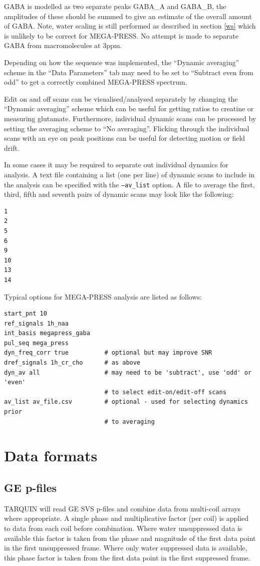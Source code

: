 \documentclass[a4paper,12pt]{article}
\begin{document}
GABA is modelled as two separate peaks GABA\_A and GABA\_B, the amplitudes of these should be summed to give an estimate of the overall amount of GABA.  Note, water scaling is still performed as described in section \ref{ws} which is unlikely to be correct for MEGA-PRESS. No attempt is made to separate GABA from macromolecules at 3ppm.

Depending on how the sequence was implemented, the ``Dynamic averaging'' scheme in the ``Data Parameters'' tab may need to be set to ``Subtract even from odd'' to get a correctly combined MEGA-PRESS spectrum.

Edit on and off scans can be visualised/analysed separately by changing the ``Dynamic averaging'' scheme which can be useful for getting ratios to creatine or measuring glutamate. Furthermore, individual dynamic scans can be processed by setting the averaging scheme to ``No averaging''. Flicking through the individual scans with an eye on peak positions can be useful for detecting motion or field drift.

In some cases it may be required to separate out individual dynamics for analysis. A text file containing a list (one per line) of dynamic scans to include in the analysis can be specified with the \texttt{---av\_list} option. A file to average the first, third, fifth and seventh pairs of dynamic scans may look like the following:
\begin{verbatim}
1
2
5
6
9
10
13
14
\end{verbatim}

Typical options for MEGA-PRESS analysis are listed as follows:

\noindent\hrulefill
\begin{verbatim}
start_pnt 10
ref_signals 1h_naa
int_basis megapress_gaba
pul_seq mega_press
dyn_freq_corr true          # optional but may improve SNR
dref_signals 1h_cr_cho      # as above
dyn_av all                  # may need to be 'subtract', use 'odd' or 'even'
                            # to select edit-on/edit-off scans
av_list av_file.csv         # optional - used for selecting dynamics prior
                            # to averaging
\end{verbatim}
\noindent\hrulefill

\section{Data formats}
\subsection{GE p-files}
TARQUIN will read GE SVS p-files and combine data from multi-coil arrays where appropriate. A single phase and multiplicative factor (per coil) is applied to data from each coil before combination. Where water unsuppressed data is available this factor is taken from the phase and magnitude of the first data point in the first unsuppressed frame. Where only water suppressed data is available, this phase factor is taken from the first data point in the first suppressed frame.
\end{document}
